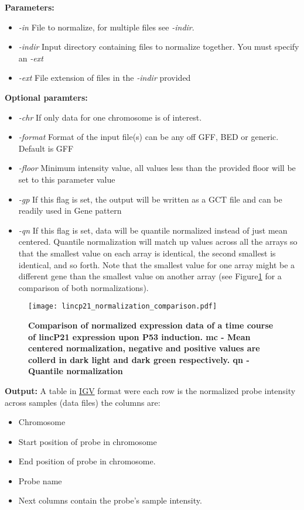 \documentclass[11pt]{article}
\begin{document}
{\bf Parameters:}
\begin{itemize}
\item {\em -in} File to normalize, for multiple files see {\em -indir}.
\item {\em -indir} Input directory containing files to normalize together. You must specify an {\em -ext }
\item {\em -ext} File extension of files in the {\em -indir} provided
\end{itemize}
{\bf Optional paramters:}
\begin{itemize}
\item {\em -chr} If only data for one chromosome is of interest.
\item {\em -format} Format of the input file(s) can be any off GFF, BED or generic. Default is GFF
\item {\em -floor} Minimum intensity value, all values less than the provided floor will be set to this parameter value
\item {\em -gp} If this flag is set, the output will be written as a GCT file and can be readily used in Gene pattern
\item {\em -qn} If this flag is set, data will be quantile normalized instead of just mean centered. Quantile normalization will match up values across all the arrays so that the smallest value on each array is identical, the second smallest is identical, and so forth. Note that the smallest value for one array might be a different gene than the smallest value on another array (see Figure\ref{lincp21.normalization} for a comparison of both normalizations).


\end{itemize}

\begin{figure}[lincp21.normalization]
  \begin{center}
    \texttt{[image: lincp21\_normalization\_comparison.pdf]}
  \end{center}
  \caption{\small {\bf Comparison of normalized expression data of a time course of lincP21 expression upon P53 induction. mc - Mean centered normalization, negative and positive values are collerd in dark light and dark green respectively. qn - Quantile normalization}}
  \label{lincp21.normalization}
\end{figure}

{\bf Output:} A table in \href{http://www.broadinstitute.org/igv/}{IGV} format were each row is the normalized probe intensity across samples (data files) the columns are:
\begin{itemize}
\item Chromosome
\item Start position of probe in chromosome
\item End position of probe in chromosome.
\item Probe name
\item Next columns contain the probe's sample intensity.
\end{itemize}
\end{document}
